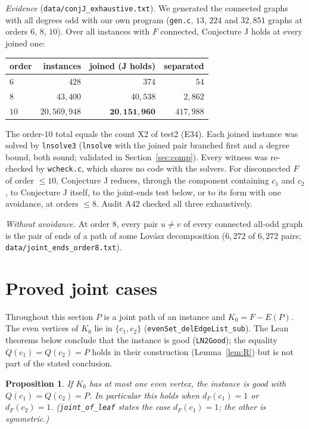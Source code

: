 \documentclass[11pt]{amsart}
\newtheorem{proposition}[theorem]{Proposition}
\theoremstyle{definition}
\newcommand{\lean}[1]{\quad{\footnotesize[Lean: \texttt{#1}]}}
\begin{document}
\emph{Evidence} (\texttt{data/conjJ\_exhaustive.txt}). We generated the connected graphs with all
degrees odd with our own program (\texttt{gen.c}, $13$, $224$ and $32{,}851$ graphs at orders $6$,
$8$, $10$). Over all instances with $F$ connected, Conjecture J holds at every joined one:
\begin{center}\footnotesize
\begin{tabular}{@{}lrrr@{}}
\toprule
order & instances & joined (J holds) & separated\\
\midrule
$6$ & $428$ & $374$ & $54$\\
$8$ & $43{,}400$ & $40{,}538$ & $2{,}862$\\
$10$ & $20{,}569{,}948$ & $\mathbf{20{,}151{,}960}$ & $417{,}988$\\
\bottomrule
\end{tabular}
\end{center}
The order-$10$ total equals the count X2 of test2 (E34). Each joined instance was solved by
\texttt{lnsolve3} (\texttt{lnsolve} with the joined pair branched first and a degree bound, both
sound; validated in Section~\ref{sec:comp}). Every witness was re-checked by \texttt{wcheck.c}, which
shares no code with the solvers. For disconnected $F$ of order $\le10$, Conjecture J reduces, through
the component containing $c_1$ and $c_2$, to Conjecture J itself, to the joint-ends test below, or to
its form with one avoidance, at orders $\le8$. Audit A42 checked all three exhaustively.

\emph{Without avoidance.} At order $8$, every pair $u\ne v$ of every connected all-odd graph is the
pair of ends of a path of some Lov\'asz decomposition ($6{,}272$ of $6{,}272$ pairs;
\texttt{data/joint\_ends\_order8.txt}).

\section{Proved joint cases}\label{sec:Jproof}

Throughout this section $P$ is a joint path of an instance and $K_0=F-E(P)$. The even vertices of
$K_0$ lie in $\{c_1,c_2\}$ (\texttt{evenSet\_delEdgeList\_sub}). The Lean theorems below conclude
that the instance is good (\texttt{LN2Good}); the equality $Q(c_1)=Q(c_2)=P$ holds in their
construction (Lemma~\ref{lem:R}) but is not part of the stated conclusion.

\begin{proposition}\label{prop:card}
If $K_0$ has at most one even vertex, the instance is good with $Q(c_1)=Q(c_2)=P$. In particular this
holds when $d_F(c_1)=1$ or $d_F(c_2)=1$.\lean{joint\_of\_card, joint\_of\_leaf}
(\texttt{joint\_of\_leaf} states the case $d_F(c_1)=1$; the other is symmetric.)
\end{proposition}
\end{document}
